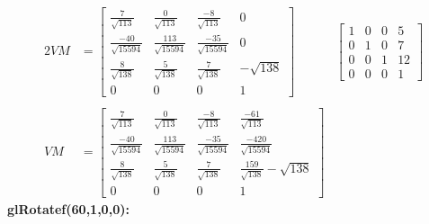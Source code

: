 \documentclass[12pt,fleqn,reqno]{article}
\begin{document}
\begin{alignat*}{2}
	VM &=\begin{bmatrix}
		\frac{7}{\sqrt{113}} & \frac{0}{\sqrt{113}} & \frac{-8}{\sqrt{113}} & 0 \\
		\frac{-40}{\sqrt{15594}} & \frac{113}{\sqrt{15594}} & \frac{-35}{\sqrt{15594}} & 0 \\
		\frac{8}{\sqrt{138}} & \frac{5}{\sqrt{138}} & \frac{7}{\sqrt{138}} & -\sqrt{138} \\
		0 & 0 & 0 & 1
	\end{bmatrix}
	&\begin{bmatrix}
		1 & 0 & 0 & 5\\
		0 & 1 & 0 & 7\\
		0 & 0 & 1 & 12\\
		0 & 0 & 0 & 1
	\end{bmatrix}\\
	\\
	VM &=\begin{bmatrix}
		\frac{7}{\sqrt{113}} & \frac{0}{\sqrt{113}} & \frac{-8}{\sqrt{113}} &   \frac{-61}{\sqrt{113}} \\
		\frac{-40}{\sqrt{15594}} & \frac{113}{\sqrt{15594}} & \frac{-35}{\sqrt{15594}} & \frac{-420}{\sqrt{15594}} \\
		\frac{8}{\sqrt{138}} & \frac{5}{\sqrt{138}} & \frac{7}{\sqrt{138}} &  \frac{159}{\sqrt{138}} -\sqrt{138} \\
		0 & 0 & 0 & 1
	\end{bmatrix}
\end{alignat*}
\newline
\textbf{glRotatef(60,1,0,0):}\\
\end{document}
